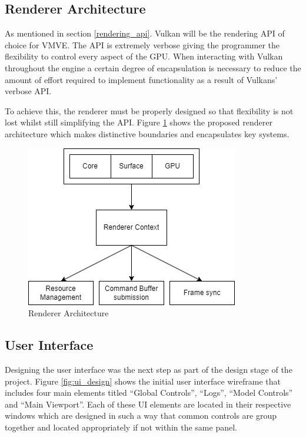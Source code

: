 \documentclass[11pt]{article}
\begin{document}
\subsection{Renderer Architecture}

As mentioned in section \ref{rendering_api}. Vulkan will be the rendering API of choice
for VMVE. The API is extremely verbose giving the programmer the flexibility to
control every aspect of the GPU. When interacting with Vulkan throughout the engine
a certain degree of encapsulation is necessary to reduce the amount of effort required to 
implement functionality as a result of Vulkans' verbose API.

To achieve this, the renderer must be properly designed so that flexibility is not lost
whilst still simplifying the API. Figure \ref{fig:rendererarch} shows the proposed renderer
architecture which makes distinctive boundaries and encapsulates key systems.

\begin{figure}[ht]
  \centering
  \includegraphics[width=\textwidth]{images/renderer_architecture.png}
  \caption{Renderer Architecture}
  \label{fig:rendererarch}
\end{figure}

\subsection{User Interface}
Designing the user interface was the next step as part of the design stage of
the project. Figure \ref{fig:ui_design} shows the initial user interface
wireframe that includes four main elements titled ``Global Controls'', ``Logs'',
``Model Controls'' and ``Main Viewport''. Each of these UI elements are located
in their respective windows which are designed in such a way that common controls are group
together and located appropriately if not within the same panel.
\end{document}
